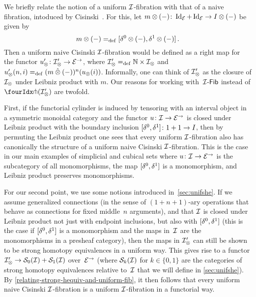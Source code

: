 \documentclass[reqno,10pt,a4paper,oneside,draft]{amsart}
\begin{document}
\begin{remark} \label{cisinski-remark}
We briefly relate the notion of a uniform $\cal{I}$-fibration with that of a naive fibration, intoduced by Cisinski~\cite{cisinski-asterisque}.
For this, let $m \otimes (-)  \co \Id_\catE + \Id_\catE \to \interval \otimes (-)$ be given by
\[
  m \otimes (-) \defeq [\lcyl \otimes (-), \rcyl \otimes (-)] \, .
\]
Then a uniform naive Cisinski $\cal{I}$-fibration would be defined as a right map for the functor $u_\otimes' \co \cal{I}_\otimes' \to \catE^\to$, where $\cal{I}_\otimes' \defeq \mathbb{N} \times \cal{I}_\otimes$ and $u_\otimes'(n, i) \defeq (m \hatotimes (-))^n(u_\otimes(i))$.
Informally, one can think of
$\cal{I}_\otimes'$ as the closure of $\cal{I}_\otimes$ under Leibniz product with $m$.
Our reasons for working with~$\Fib{\cal{I}}$ instead of $\liftr{(\cal{I}_\otimes')}$ are twofold.

First, if the functorial cylinder is induced by tensoring with an interval object in a symmetric monoidal category and the functor $u \co \cal{I} \to \catE^\to$ is closed under Leibniz product with the boundary inclusion $[\lcyl, \rcyl] \co 1 + 1 \to \interval$, then by permuting the Leibniz product one sees that every uniform $\cal{I}$-fibration also has canonically the structure of a uniform naive Cisinski $\cal{I}$-fibration.
This is the case in our main examples of simplicial and cubical sets where $u \co \cal{I} \to \catE^\to$ is the subcategory of all monomorphisms, the map $[\lcyl, \rcyl]$ is a  monomorphism, and Leibniz product preserves  monomorphisms.

For our second point, we use some notions introduced in~\cref{sec:unifshe}.
If we assume generalized connections (in the sense of $(1+n+1)$-ary operations that behave as connections for fixed middle~$n$ arguments), and that $\cal{I}$ is closed under Leibniz product not just with endpoint inclusions, but also with $[\lcyl, \rcyl]$ (this is the case if $[\lcyl, \rcyl]$ is a  monomorphism and the maps in~$\cal{I}$ are the  monomorphisms in a presheaf category), then the maps in $\cal{I}_\otimes'$ can still be shown to be strong homotopy equivalences in a uniform way.
This gives rise to a functor $\cal{I}_\otimes' \to \cal{S}_0(\cal{I}) + \cal{S}_1(\cal{I})$ over~$\catE^\to$ (where $\cal{S}_k(\cal{I})$ for $k \in \{0,1\}$ are the categories of strong homotopy equivalences relative to~$\cal{I}$ that we will define in \cref{sec:unifshe}).
By \cref{relating-strong-hequiv-and-uniform-fib}, it then follows that every uniform naive Cisinski $\cal{I}$-fibration is a uniform $\cal{I}$-fibration in a functorial way.
\end{remark}
\end{document}
